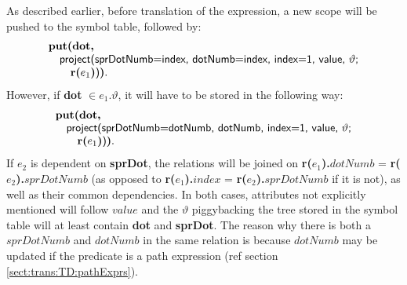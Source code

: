 As described earlier, before translation of the expression, a new scope will be pushed to the symbol table,
followed by:
\begin{equation*}
\begin{array}{l}
\mbox{\textbf{put(dot,}} \\ \quad
\mbox{\textsf{project(sprDotNumb=index, dotNumb=index, index=1, value, }}\vartheta\mbox{\textsf{;}} \\ \quad\quad
\mbox{\textbf{r(}}e_1\mbox{\textbf{)}\textsf{)}\textbf{)}}.
\end{array} 
\end{equation*}
However, if \textbf{dot} $\in e_1.\vartheta$, it will have to be stored in the following way:
\begin{equation*}
\begin{array}{l}
\mbox{\textbf{put(dot,}} \\ \quad
\mbox{\textsf{project(sprDotNumb=dotNumb, dotNumb, index=1, value, }}\vartheta\mbox{\textsf{;}} \\ \quad\quad
\mbox{\textbf{r(}}e_1\mbox{\textbf{)}\textsf{)}\textbf{)}}.
\end{array} 
\end{equation*}
If $e_2$ is dependent on \textbf{sprDot}, the relations will be joined on \textbf{r(}$e_1$\textbf{).}$dotNumb$
\textsf{=} \textbf{r(}$e_2$\textbf{).}$sprDotNumb$ (as opposed to \textbf{r(}$e_1$\textbf{).}$index$ \textsf{=}
\textbf{r(}$e_2$\textbf{).}$sprDotNumb$ if it is not), as well as their common dependencies. In both cases,
attributes not explicitly mentioned will follow $value$ and the $\vartheta$ piggybacking the tree stored in the
symbol table will at least contain \textbf{dot} and \textbf{sprDot}. The reason why there is both a $sprDotNumb$
and $dotNumb$ in the same relation is because $dotNumb$ may be updated if the predicate is a path expression (ref
section \ref{sect:trans:TD:pathExprs}).

